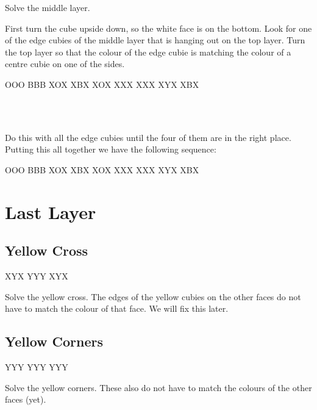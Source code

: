 \documentclass{article}
\begin{document}
    \begin{goal}
        Solve the middle layer.
    \end{goal}

    First turn the cube upside down, so the white face is on the bottom.
    Look for one of the edge cubies of the middle layer that is hanging out on the top layer.
    Turn the top layer so that the colour of the edge cubie is matching the colour of a centre cubie on one of the sides.

    \RubikSliceBottomR OOO BBB
    \RubikSliceMiddleR XOX XBX
    \RubikSliceTopR XOX XXX
    \RubikFaceUp XXX XYX XBX

    \\
    \\
    \textcube{}

    Do this with all the edge cubies until the four of them are in the right place.
    Putting this all together we have the following sequence:

    \RubikCubeGreyWY
    \RubikSliceBottomR OOO BBB
    \RubikSliceMiddleR XOX XBX
    \RubikSliceTopR XOX XXX
    \RubikFaceUp XXX XYX XBX
    \textcube{}
    \textcube{}

    \section{Last Layer}

    \subsection{Yellow Cross}

    \RubikCubeGreyAll
    \RubikFaceUp XYX YYY XYX

    \begin{goal}[\DrawRubikFaceUp]
        Solve the yellow cross.
        The edges of the yellow cubies on the other faces do not have to match the colour of that face.
        We will fix this later.
    \end{goal}

    \subsection{Yellow Corners}
    \RubikCubeGreyAll
    \RubikFaceUp YYY YYY YYY

    \begin{goal}[\DrawRubikFaceUp]
        Solve the yellow corners.
        These also do not have to match the colours of the other faces (yet).
    \end{goal}
\end{document}
